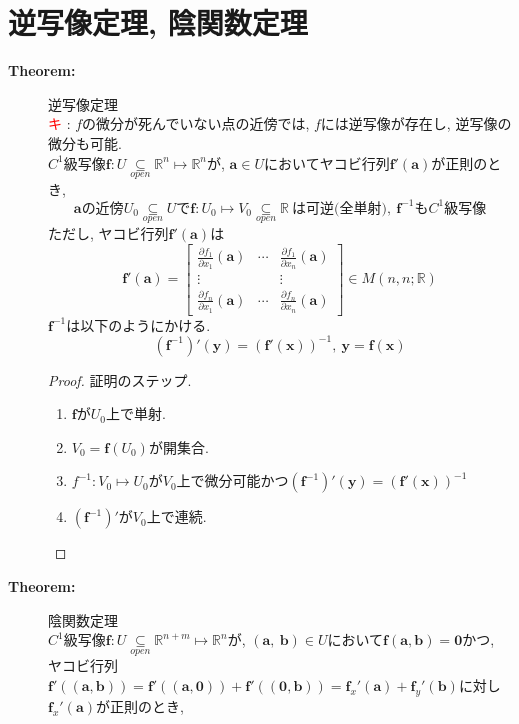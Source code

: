 \documentclass[dvipdfmx]{jsarticle}
\newcommand{\point}{\textcircled{\textcolor{red}{\scriptsize キ}} }
\newcommand{\opensubset}{\underset{open}{\subseteq}}
\begin{document}
\section{逆写像定理, 陰関数定理}
\begin{description}
    \item[\bf{Theorem:}] 逆写像定理 \\
        \point : $f$の微分が死んでいない点の近傍では, $f$には逆写像が存在し, 逆写像の微分も可能. \\
        $C^1$級写像$\bm{f} : U \opensubset \mathbb{R}^n \mapsto \mathbb{R}^n$が, 
        $\bm{a} \in U$においてヤコビ行列$\bm{f}'(\bm{a})$が正則のとき,
        $$ \bm{a} \text{の近傍} U_0 \opensubset U \text{で} \bm{f} : U_0 \mapsto V_0 \opensubset \mathbb{R} \ \text{は可逆(全単射)} ,\ \bm{f}^{-1} \text{も} C^1 \text{級写像}$$
        ただし, ヤコビ行列$\bm{f}'(\bm{a})$は
        $$ \bm{f}'(\bm{a}) = \begin{bmatrix}
            \frac{\partial f_1}{\partial x_1}(\bm{a}) & \cdots & \frac{\partial f_1}{\partial x_n}(\bm{a}) \\
            \vdots & & \vdots \\
            \frac{\partial f_n}{\partial x_1}(\bm{a}) & \cdots & \frac{\partial f_n}{\partial x_n}(\bm{a})
        \end{bmatrix} \in M(n,n;\mathbb{R})$$
        $\bm{f}^{-1}$は以下のようにかける.
        $$ ({\bm{f}^{-1}})'(\bm{y}) = (\bm{f}'(\bm{x}))^{-1},\ \bm{y} = \bm{f}(\bm{x}) $$
    
        \begin{proof} 証明のステップ.
            \begin{enumerate}
                \item $\bm{f}$が$U_0$上で単射.
                \item $V_0 = \bm{f}(U_0)$が開集合.
                \item $f^{-1} : V_0 \mapsto U_0$が$V_0$上で微分可能かつ$({\bm{f}^{-1}})'(\bm{y}) = (\bm{f}'(\bm{x}))^{-1}$
                \item $(\bm{f}^{-1})'$が$V_0$上で連続.
            \end{enumerate}
        \end{proof}
    
    \item[\bf{Theorem:}] 陰関数定理 \\
        $C^1$級写像$\bm{f} : U \opensubset \mathbb{R}^{n+m} \mapsto \mathbb{R}^n$が, $(\bm{a},\ \bm{b}) \in U$において$\bm{f}(\bm{a},\bm{b}) = \bm{0}$かつ, \\
        ヤコビ行列$\bm{f}'((\bm{a}, \bm{b})) = \bm{f}'((\bm{a}, \bm{0})) + \bm{f}'((\bm{0}, \bm{b})) = \bm{f}_x'(\bm{a}) + \bm{f}_y'(\bm{b})$に対し$\bm{f}_x'(\bm{a})$が正則のとき, 
        

\end{description}
\end{document}
